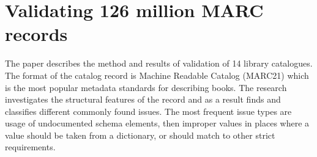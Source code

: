 \chapter{Validating 126 million MARC records}

The paper describes the method and results of validation of 14 library catalogues. The format of the catalog record is Machine Readable Catalog (MARC21) which is the most popular metadata standards for describing books. The research investigates the structural features of the record and as a result finds and classifies different commonly found issues. The most frequent issue types are usage of undocumented schema elements, then improper values in places where a value should be taken from a dictionary, or should match to other strict requirements.


